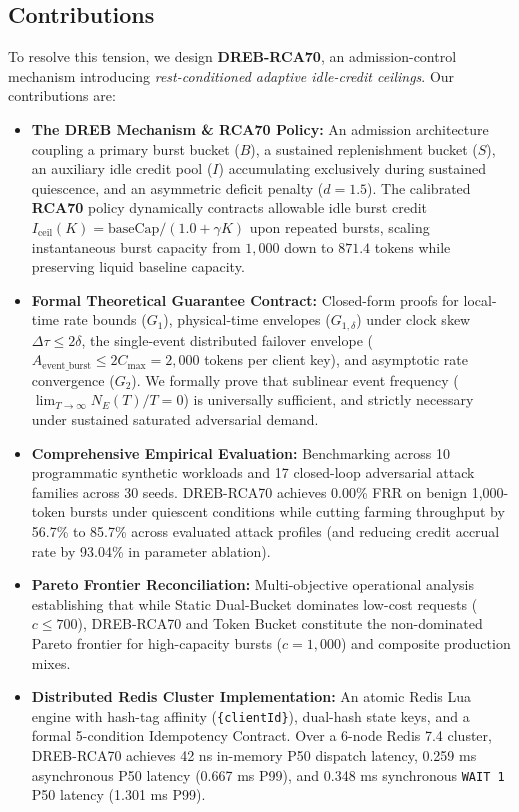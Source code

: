 \documentclass[conference]{IEEEtran}
\begin{document}
\subsection{Contributions}
To resolve this tension, we design \textbf{DREB-RCA70}, an admission-control mechanism introducing \textit{rest-conditioned adaptive idle-credit ceilings}. Our contributions are:
\begin{itemize}
    \item \textbf{The DREB Mechanism \& RCA70 Policy:} An admission architecture coupling a primary burst bucket ($B$), a sustained replenishment bucket ($S$), an auxiliary idle credit pool ($I$) accumulating exclusively during sustained quiescence, and an asymmetric deficit penalty ($d=1.5$). The calibrated \textbf{RCA70} policy dynamically contracts allowable idle burst credit $I_{\text{ceil}}(K) = \text{baseCap} / (1.0 + \gamma K)$ upon repeated bursts, scaling instantaneous burst capacity from $1,000$ down to $871.4$ tokens while preserving liquid baseline capacity.
    \item \textbf{Formal Theoretical Guarantee Contract:} Closed-form proofs for local-time rate bounds ($G_1$), physical-time envelopes ($G_{1,\delta}$) under clock skew $\Delta \tau \le 2\delta$, the single-event distributed failover envelope ($A_{\text{event\_burst}} \le 2 C_{\max} = 2,000$ tokens per client key), and asymptotic rate convergence ($G_2$). We formally prove that sublinear event frequency ($\lim_{T\to\infty} N_E(T)/T = 0$) is universally sufficient, and strictly necessary under sustained saturated adversarial demand.
    \item \textbf{Comprehensive Empirical Evaluation:} Benchmarking across 10 programmatic synthetic workloads and 17 closed-loop adversarial attack families across 30 seeds. DREB-RCA70 achieves 0.00\% FRR on benign 1,000-token bursts under quiescent conditions while cutting farming throughput by 56.7\% to 85.7\% across evaluated attack profiles (and reducing credit accrual rate by 93.04\% in parameter ablation).
    \item \textbf{Pareto Frontier Reconciliation:} Multi-objective operational analysis establishing that while Static Dual-Bucket dominates low-cost requests ($c \le 700$), DREB-RCA70 and Token Bucket constitute the non-dominated Pareto frontier for high-capacity bursts ($c = 1,000$) and composite production mixes.
    \item \textbf{Distributed Redis Cluster Implementation:} An atomic Redis Lua engine with hash-tag affinity (\texttt{\{clientId\}}), dual-hash state keys, and a formal 5-condition Idempotency Contract. Over a 6-node Redis 7.4 cluster, DREB-RCA70 achieves 42 ns in-memory P50 dispatch latency, 0.259 ms asynchronous P50 latency (0.667 ms P99), and 0.348 ms synchronous \texttt{WAIT 1} P50 latency (1.301 ms P99).
\end{itemize}
\end{document}
